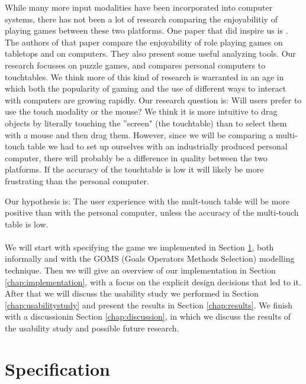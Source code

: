 \documentclass[a4paper,10pt]{report}
\begin{document}
While many more input modalities have been incorporated into computer systems, there has not been a lot of research comparing the enjoyabilitiy of playing games between these two platforms. 
One paper that did inspire us is \cite{Tychsen2007}.
The authors of that paper compare the enjoyability of role playing games on tabletops and on computers.
They also present some useful analyzing tools. 
Our research focusses on puzzle games, and compares personal computers to touchtables.
We think more of this kind of research is warranted in an age in which both the popularity of gaming and the use of different ways to interact with computers are growing rapidly.
Our research question is: Will users prefer to use the touch modality or the mouse? 
We think it is more intuitive to drag objects by literally touching the ''screen" (the touchtable) than to select them with a mouse and then drag them.
However, since we will be comparing a multi-touch table we had to set up ourselves with an industrially produced personal computer, there will probably be a difference in quality between the two platforms. If the accuracy of the touchtable is low it will likely be more frustrating than the personal computer.

Our hypothesis is: The user experience with the mult-touch table will be more positive than with the personal computer, unless the accuracy of the multi-touch table is low. \\\\
We will start with specifying the game we implemented in Section \ref{chap:specification}, both informally and with the  GOMS (Goals Operators Methods Selection) modelling technique. 
Then we will give an overview of our implementation in Section \ref{chap:implementation}, with a focus on the explicit design decisions that led to it. After that we will discuss the usability study we performed in Section \ref{chap:usabilitystudy} and present the results in Section \ref{chap:results}. 
We finish with a discussionin Section \ref{chap:discussion}, in which we discuss the results of the usability study and possible future research. 

\chapter{Specification}
\label{chap:specification}
\end{document}
